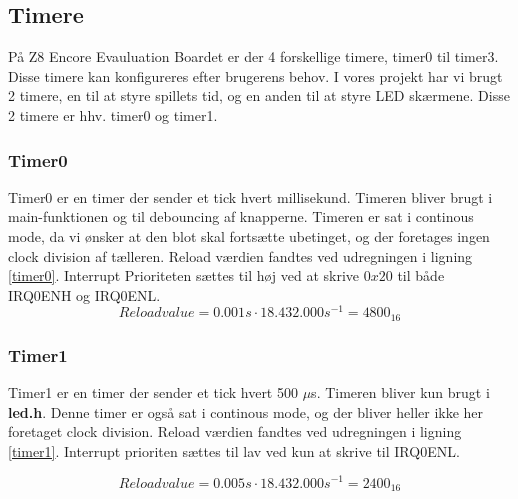 \subsection{Timere}
På Z8 Encore Evauluation Boardet er der 4 forskellige timere, timer0 til timer3. Disse timere kan konfigureres efter brugerens behov. I vores projekt har vi brugt 2 timere, en til at styre spillets tid, og en anden til at styre LED skærmene. Disse 2 timere er hhv. timer0 og timer1.
\subsubsection{Timer0}
Timer0 er en timer der sender et tick hvert millisekund. Timeren bliver brugt i main-funktionen og til debouncing af knapperne. Timeren er sat i continous mode, da vi ønsker at den blot skal fortsætte ubetinget, og der foretages ingen clock division af tælleren. Reload værdien fandtes ved udregningen i ligning \ref{timer0}. Interrupt Prioriteten sættes til høj ved at skrive $0x20$ til både IRQ0ENH og IRQ0ENL.
\begin{equation}
\label{timer0}
Reloadvalue = 0.001 \si{s} \cdot 18.432.000 \si{s^{-1}} = 4800_{16} 
\end{equation}
\subsubsection{Timer1}
Timer1 er en timer der sender et tick hvert 500 $\mu$s. Timeren bliver kun brugt i \textbf{led.h}. Denne timer er også sat i continous mode, og der bliver heller ikke her foretaget clock division. Reload værdien fandtes ved udregningen i ligning \ref{timer1}. Interrupt prioriten sættes til lav ved kun at skrive til IRQ0ENL.

\begin{equation}
\label{timer1}
Reloadvalue  = 0.005 \si{s} \cdot 18.432.000 \si{s^{-1}} = 2400_{16}  
\end{equation}